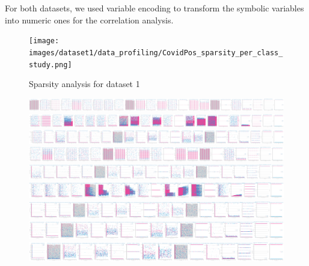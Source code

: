 \documentclass[10pt]{extarticle}
\begin{document}
For both datasets, we used variable encoding to transform the symbolic variables into numeric ones for the correlation analysis.

\begin{figure}[H]
\centering\texttt{[image: images/dataset1/data\_profiling/CovidPos\_sparsity\_per\_class\_study.png]}
\caption{Sparsity analysis for dataset 1}
\end{figure}

\begin{figure}[H]
\centering\includegraphics[scale=0.10]{images/dataset2/data_profiling/Credit_Score_sparsity_Month_per_class.png}
\includegraphics[scale=0.10]{images/dataset2/data_profiling/Credit_Score_sparsity_Name_per_class.png}
\includegraphics[scale=0.10]{images/dataset2/data_profiling/Credit_Score_sparsity_Age_per_class.png}
\includegraphics[scale=0.10]{images/dataset2/data_profiling/Credit_Score_sparsity_Occupation_per_class.png}
\includegraphics[scale=0.10]{images/dataset2/data_profiling/Credit_Score_sparsity_Annual_Income_per_class.png}
\includegraphics[scale=0.10]{images/dataset2/data_profiling/Credit_Score_sparsity_Monthly_Inhand_Salary_per_class.png}
\includegraphics[scale=0.10]{images/dataset2/data_profiling/Credit_Score_sparsity_Num_Bank_Accounts_per_class.png}
\includegraphics[scale=0.10]{images/dataset2/data_profiling/Credit_Score_sparsity_Num_Credit_Card_per_class.png}
\includegraphics[scale=0.10]{images/dataset2/data_profiling/Credit_Score_sparsity_Interest_Rate_per_class.png}

\end{figure}
\end{document}
